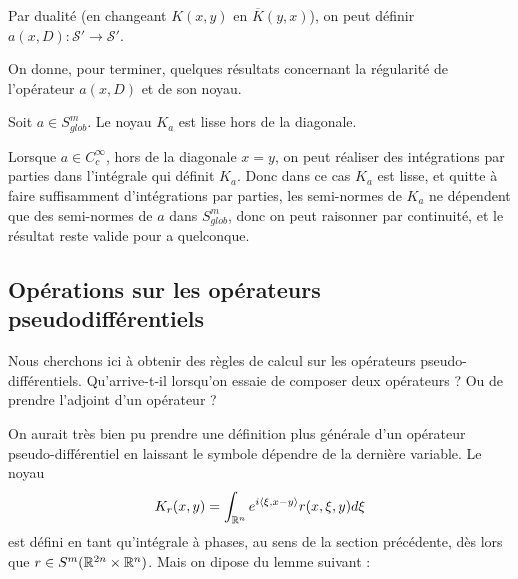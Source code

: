 Par dualité (en changeant $K(x,y)$ en $\overline{K}(y,x)$), on peut définir $a(x,D):\mathcal{S}' \to \mathcal{S}'$.

On donne, pour terminer, quelques résultats concernant la régularité de l'opérateur $a(x,D)$ et de son noyau.

\begin{prop}
	\label{prop:regPDO}
	Soit $a \in S^m_{glob}$. Le noyau $K_a$ est lisse hors de la diagonale.
\end{prop}
\begin{preuve}
	Lorsque $a \in C^{\infty}_c$, hors de la diagonale $x=y$, on peut réaliser des intégrations par parties dans l'intégrale qui définit $K_a$. Donc dans ce cas $K_a$ est lisse, et quitte à faire suffisamment d'intégrations par parties, les semi-normes de $K_a$ ne dépendent que des semi-normes de $a$ dans $S^m_{glob}$, donc on peut raisonner par continuité, et le résultat reste valide pour a quelconque.
\end{preuve}

\subsection{Opérations sur les opérateurs pseudodifférentiels}
Nous cherchons ici à obtenir des règles de calcul sur les opérateurs pseudo-différentiels. Qu'arrive-t-il lorsqu'on essaie de composer deux opérateurs ? Ou de prendre l'adjoint d'un opérateur ?

On aurait très bien pu prendre une définition plus générale d'un opérateur pseudo-différentiel en laissant le symbole dépendre de la dernière variable. Le noyau
\begin{equation*}
	K_r(x,y)= \int_{\mathbb{R}^n}e^{i\langle \xi, x-y \rangle} r(x,\xi,y)d\xi
\end{equation*}
est défini en tant qu'intégrale à phases, au sens de la section précédente, dès lors que $r \in S^m(\mathbb{R}^{2n}\times \mathbb{R}^n)$. Mais on dipose du lemme suivant :

